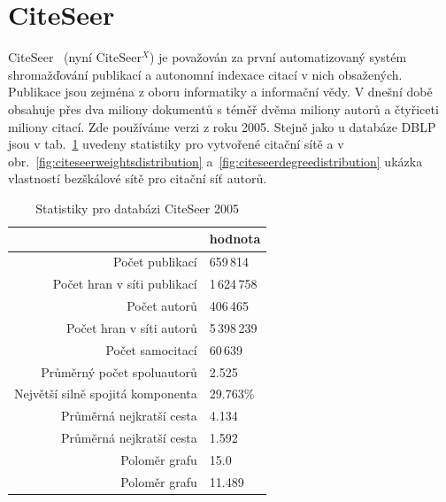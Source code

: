 \documentclass{bakalarka}
\begin{document}
\section{CiteSeer}
CiteSeer~\citep{citeseer} (nyní CiteSeer$^X$) je považován za první
automatizovaný systém shromažďování publikací a autonomní indexace citací v
nich obsažených. Publikace jsou zejména z oboru informatiky a informační vědy.
V dnešní době obsahuje přes dva miliony dokumentů s téměř dvěma miliony autorů
a čtyřiceti miliony citací. Zde používáme verzi z roku 2005.
Stejně jako u databáze DBLP jsou v tab.~\ref{tab:citeseerstat} uvedeny
statistiky pro vytvořené citační sítě a v
obr.~\ref{fig:citeseerweightsdistribution}
a~\ref{fig:citeseerdegreedistribution} ukázka vlastností bezškálové sítě pro
citační síť autorů.

\begin{table}[!ht]
\centering
\caption{Statistiky pro databázi CiteSeer 2005}
\label{tab:citeseerstat}
\begin{tabular}{r|l}
\toprule
& hodnota \\
\midrule
Počet publikací & 659\,814 \\
Počet hran v síti publikací & 1\,624\,758 \\
Počet autorů & 406\,465 \\
Počet hran v síti autorů & 5\,398\,239 \\
Počet samocitací & 60\,639 \\
Průměrný počet spoluautorů & 2.525 \\
Největší silně spojitá komponenta & 29.763\% \\
Průměrná nejkratší cesta\footnotemark[1] & 4.134 \\
Průměrná nejkratší cesta\footnotemark[2] & 1.592 \\
Poloměr grafu\footnotemark[1] & 15.0   \\
Poloměr grafu\footnotemark[2] & 11.489 \\
\bottomrule
\end{tabular}
\end{table}
\end{document}
